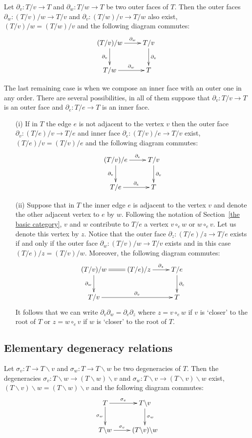 \documentclass[a4paper]{amsart}
\theoremstyle{plain}
\theoremstyle{definition}
\theoremstyle{remark}
\newcommand{\To}{\longrightarrow}
\numberwithin{equation}{section}
\numberwithin{figure}{section}
\begin{document}
Let $\partial_v:T/v\To T$ and $\partial_w:T/w\To T$ be two outer faces of $T$. Then the outer faces
$\partial_w:(T/v)/w\To T/v$ and $\partial_v:(T/w)/v\To T/w$ also exist, $(T/v)/w=(T/w)/v$ and the following diagram
commutes:
$$\xymatrix{(T/v)/w\ar[r]^-{\partial_w}\ar[d]_-{\partial_v} & T/v\ar[d]^-{\partial_v}\\ T/w\ar[r]^-{\partial_w} &T}$$

The last remaining case is when we compose an inner face with an outer one in any order. There are several
possibilities, in all of them suppose that $\partial_v:T/v\To T$ is an outer face and $\partial_e:T/e\To T$ is an inner
face.
\begin{itemize}
\item[{\rm (i)}] If in  $T$ the edge $e$ is not adjacent to the vertex $v$ then the outer face $\partial_v:(T/e)/v\To T/e$ and inner
face $\partial_e:(T/v)/e\To T/v$ exist, $(T/e)/v=(T/v)/e$ and the following diagram commutes:
$$\xymatrix{(T/v)/e\ar[r]^-{\partial_e}\ar[d]_-{\partial_v} &T/v\ar[d]^-{\partial_v}\\
T/e\ar[r]^-{\partial_e} &T}$$
\item[{\rm (ii)}] Suppose that in  $T$ the inner edge $e$ is adjacent to the vertex $v$  and denote the other adjacent vertex to $e$ by
$w$. Following the notation of Section~\ref{the basic category}, $v$ and $w$ contribute to $T/e$ a vertex $v\circ_e w$ or
$w\circ_e v$.
Let us denote this vertex  by $z$. Notice that the outer face $\partial_z:(T/e)/z\To T/e$ exists if and only if the outer
face $\partial_w:(T/v)/w\To T/v$ exists and in this case $(T/e)/z=(T/v)/w$. Moreover, the following diagram commutes:
$$\xymatrix{(T/v)/w\ar@{=}[r]\ar[d]_-{\partial_w} &(T/e)/z\ar[r]^-{\partial_z} &T/e\ar[d]^-{\partial_e}\\
T/v\ar[rr]^-{\partial_v} &&T}$$
It follows that we can write $\partial_v\partial_w=\partial_e\partial_z$ where $z=v\circ_e w$ if $v$ is `closer' to the root
of $T$ or $z=w\circ_e v$ if $w$ is `closer' to the root of $T$.
\end{itemize}

\subsection{Elementary degeneracy relations}
\label{degdeg}
Let $\sigma_v:T \To T\backslash v$ and $\sigma_w:T\To T\backslash w$ be two degeneracies of $T$. Then the degeneracies
$\sigma_v:T\backslash w\To (T\backslash w)\backslash v$ and $\sigma_w:T\backslash v\To (T\backslash v)\backslash w$ exist,
$(T\backslash v)\backslash w = (T\backslash w)\backslash v$ and the following diagram commutes:
$$\xymatrix{T\ar[r]^-{\sigma_v}\ar[d]_-{\sigma_w} & T\backslash v\ar[d]^-{\sigma_w}\\
T\backslash w\ar[r]^-{\sigma_v} & (T\backslash v)\backslash w}$$
\end{document}
